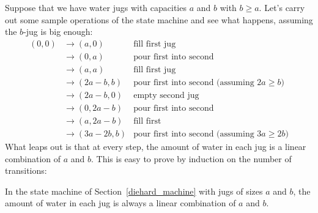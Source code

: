 Suppose that we have water jugs with capacities $a$ and $b$ with $b
\geq a$.  Let's carry out some sample operations of the state machine
and see what happens, assuming the $b$-jug is big enough:
\begin{align*}
(0,0) & \rightarrow (a,0) & \text{fill first jug} \\
& \rightarrow (0,a) & \text{pour first
    into second} \\
& \rightarrow (a, a) & \text{fill first jug} \\
& \rightarrow (2a-b, b)
  & \text{pour first into second (assuming $2a \geq b$)} \\
& \rightarrow (2a-b, 0) &
  \text{empty second jug} \\
& \rightarrow (0, 2a-b) & \text{pour first into second} \\
&
  \rightarrow (a, 2a-b) & \text{fill first} \\
& \rightarrow (3a-2b, b) & \text{pour first
    into second (assuming $3a \geq 2b$)}
\end{align*}
What leaps out is that at every step, the amount of water in each jug
is a linear combination of $a$ and $b$.  This is easy to prove by
induction on the number of transitions:
\begin{lemma}\label{lem:waterjugs}
In the \emph{} state machine of
Section~\ref{diehard_machine} with jugs of sizes $a$ and $b$, the
amount of water in each jug is always a linear combination of $a$ and
$b$.
\end{lemma}


